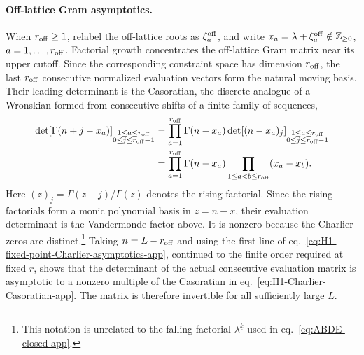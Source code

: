 \documentclass[a4paper,11pt]{article}
\theoremstyle{definition}
\theoremstyle{remark}
\begin{document}
\paragraph{Off-lattice Gram asymptotics.}
When \(r_{\rm off}\ge1\), relabel the off-lattice roots as
\(\xi_a^{\rm off}\), and write
\(x_a=\lambda+\xi_a^{\rm off}\notin\mathbb Z_{\ge0}\),
\(a=1,\ldots,r_{\rm off}\). Factorial growth concentrates the off-lattice Gram matrix near its upper cutoff. Since the corresponding constraint space has dimension \(r_{\rm off}\), the last \(r_{\rm off}\) consecutive normalized evaluation vectors form the natural moving basis. Their leading determinant is the Casoratian, the discrete analogue of a Wronskian formed from consecutive shifts of a finite family of sequences,
\begin{equation}
\begin{aligned}
   \det\!\left[\Gamma(n+j-x_a)\right]_{
      \substack{1\le a\le r_{\rm off}\\
      0\le j\le r_{\rm off}-1}}
   &=\prod_{a=1}^{r_{\rm off}}\Gamma(n-x_a)
   \det\!\left[(n-x_a)_j\right]_{
      \substack{1\le a\le r_{\rm off}\\
      0\le j\le r_{\rm off}-1}}\\
   &=\prod_{a=1}^{r_{\rm off}}\Gamma(n-x_a)
   \prod_{1\le a<b\le r_{\rm off}}(x_a-x_b).
\end{aligned}
   \label{eq:H1-Charlier-Casoratian-app}
\end{equation}
Here \((z)_j=\Gamma(z+j)/\Gamma(z)\) denotes the rising factorial.
Since the rising factorials form a monic polynomial basis in $z=n-x$,
their evaluation determinant is the Vandermonde factor above. It is
nonzero because the Charlier zeros are distinct.\footnote{This notation is
unrelated to the falling factorial
\(\lambda^{\underline{k}}\) used in eq.~\eqref{eq:ABDE-closed-app}.} Taking
\(n=L-r_{\rm off}\) and using the first line of
eq.~\eqref{eq:H1-fixed-point-Charlier-asymptotics-app}, continued to
the finite order required at fixed $r$, shows that the determinant of
the actual consecutive evaluation matrix is asymptotic to a nonzero
multiple of the Casoratian in eq.~\eqref{eq:H1-Charlier-Casoratian-app}.
The matrix is therefore invertible for all sufficiently large \(L\).
\end{document}
